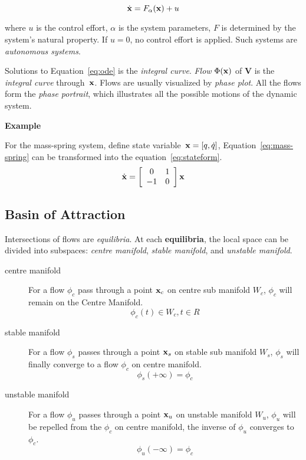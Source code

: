 \begin{equation}
\label{eq:ode}
\dot{\mathbf{x}}=F_{\alpha}(\mathbf{x})+u
\end{equation}



where $u$ is the control effort, 
$\alpha$ is the system parameters,
$F$ is determined by the system's natural property.
If $u=0$,  no control effort is applied.
Such systems are \emph{autonomous systems}. 

Solutions to Equation~\ref{eq:ode} is the \emph{integral curve}. 
\emph{Flow} $\Phi(\mathbf{x})$ of $\mathbf{V}$ is the \emph{integral curve} through~$\mathbf{x}$. 
Flows are usually visualized by \emph{phase plot}.
All the flows form the \emph{phase portrait}, which illustrates all the possible motions of the dynamic system.


\textbf{Example}

For the mass-spring system, define state variable~$\mathbf{x}=[q,\dot{q}]$, Equation~\ref{eq:mass-spring} can be transformed into the equation~\ref{eq:stateform}.
\begin{equation}
\label{eq:stateform}
\dot{\mathbf{x}}=
\left[ 
\begin{array}{cc}
0 &1\\
-1 &0 
\end{array}
\right]\mathbf{x}
\end{equation}



\subsection{Basin of Attraction}
Intersections of flows are \emph{equilibria}.
At each \textbf{equilibria}, the local space can be divided into subspaces: 
\emph{centre manifold}, \emph{stable manifold}, and \emph{unstable manifold}.
\begin{description} 
\item[centre manifold]
For a flow $\phi_c$ pass through a point $\mathbf{x}_{c}$ on centre sub manifold $W_{c}$, $\phi_c$ will remain on the Centre Manifold. 
\[
\phi_{c}(t) \in W_{c}, t \in R
\]

\item [stable manifold]
For a flow $\phi_{s}$ passes through a point $\mathbf{x}_{s}$ on stable sub manifold $W_{s}$, $\phi_s$ will finally converge to a flow $\phi_c$ on centre manifold.
\[
\phi_{s}(+\infty)=\phi_{c}
\]
\item[unstable manifold]
For a flow $\phi_u$ passes through a point $\mathbf{x}_u$ on unstable manifold $W_{u}$, $\phi_u$ will be repelled from the $\phi_c$ on centre manifold, the inverse of $\phi_u$ converges to $\phi_c$. 
\[
\phi_{u}(-\infty)=\phi_{c}
\] 
\end{description}


